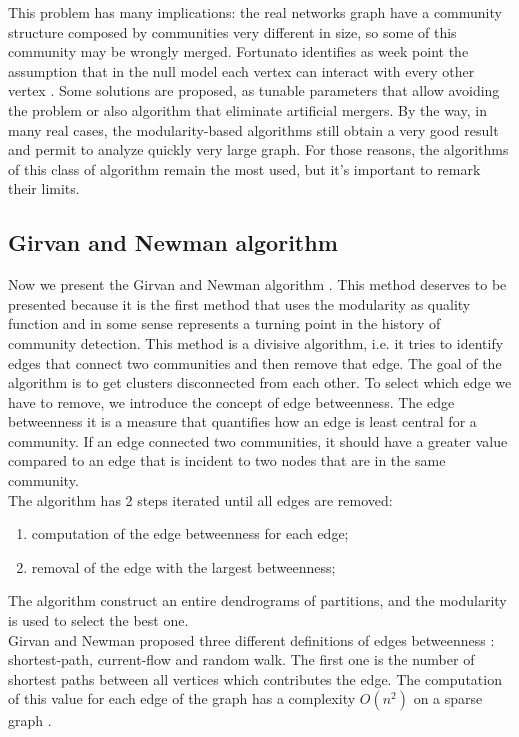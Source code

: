 This problem has many implications: the real networks graph have a community structure composed by communities very different in size, so some of this community may be wrongly merged. Fortunato identifies as week point the assumption that in the null model each vertex can interact with every other vertex \cite{fortunato}. Some solutions are proposed, as tunable parameters that allow avoiding the problem or also algorithm that eliminate artificial mergers. By the way, in many real cases, the modularity-based algorithms still obtain a very good result and permit to analyze quickly very large graph. For those reasons, the algorithms of this class of algorithm remain the most used, but it's important to remark their limits.

\subsection{Girvan and Newman algorithm}
Now we present the Girvan and Newman algorithm \cite{Girvan2002Community}. This method deserves to be presented because it is the first method that uses the modularity as quality function \cite{Newman_2004} and in some sense represents a turning point in the history of community detection. This method is a divisive algorithm, i.e. it tries to identify edges that connect two communities and then remove that edge. The goal of the algorithm is to get clusters disconnected from each other.  
To select which edge we have to remove, we introduce the concept of edge betweenness.
The edge betweenness it is a measure that quantifies how an edge is least central for a community. 
If an edge connected two communities, it should have a greater value compared to an edge that is incident to two nodes that are in the same community. \\
The algorithm has 2 steps iterated until all edges are removed:
\begin{enumerate}
	\item computation of the edge betweenness for each edge;
	\item removal of the edge with the largest betweenness;
\end{enumerate}
The algorithm construct an entire dendrograms of partitions, and the modularity is used to select the best one.\\ 
Girvan and Newman proposed three different definitions of edges betweenness \cite{Newman_2004}: shortest-path, current-flow and random walk. The first one is the number of shortest paths between all vertices which contributes the edge. The computation of this value for each edge of the graph has a complexity $O(n^2)$ on a sparse graph \cite{Newman_2004}. 
